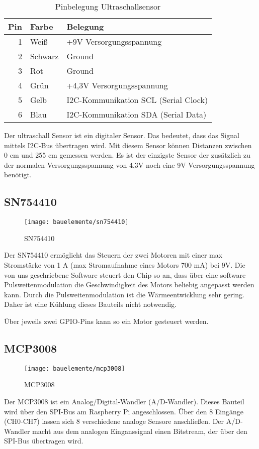 \begin{table}[!ht]
\centering
\rmfamily
\caption{Pinbelegung Ultraschallsensor}
\renewcommand{\arraystretch}{1.1}
\sffamily
\begin{footnotesize}
\begin{tabular}{r | l l}
\toprule
\textbf{Pin} & \textbf{Farbe}  & \textbf{Belegung}\\
\midrule
1 & Weiß & +9V Versorgungsspannung \\
2 & Schwarz & Ground \\
3 & Rot & Ground \\
4 & Grün & +4,3V Versorgungsspannung \\
5 & Gelb & I2C-Kommunikation SCL (Serial Clock) \\
6 & Blau & I2C-Kommunikation SDA (Serial Data) \\
\bottomrule
\end{tabular}
\end{footnotesize}
\label{eb:ultraschall:tbl}
\end{table}

Der ultraschall Sensor ist ein digitaler Sensor. Das bedeutet, dass das Signal mittels I2C-Bus übertragen wird. Mit diesem Sensor können Distanzen zwischen  0 cm und 255 cm gemessen werden. Es ist der einzigste Sensor der zusätzlich zu der normalen Versorgungsspannung von 4,3V noch eine 9V Versorgungsspannung benötigt.

\subsection{SN754410}\label{eb:pwm}
\begin{wrapfigure}{r}{0.65\textwidth}
\texttt{[image: bauelemente/sn754410]}
\caption{SN754410}
\label{eb:fig:sn754410}
\end{wrapfigure}
Der SN754410 ermöglicht das Steuern der zwei Motoren mit einer max Stromstärke von 1 A (max Stromaufnahme eines Motors 700 mA) bei 9V. Die von uns  geschriebene Software steuert den Chip so an, dass über eine software Pulsweitenmodulation die Geschwindigkeit des Motors beliebig angepasst werden kann. Durch die Pulsweitenmodulation ist die Wärmeentwicklung sehr gering. Daher ist eine Kühlung dieses Bauteils nicht notwendig.

Über jeweils zwei GPIO-Pins kann so ein Motor gesteuert werden.

\subsection{MCP3008}\label{eb:adwandler}
\begin{wrapfigure}{r}{0.4\textwidth}
\texttt{[image: bauelemente/mcp3008]}
\caption{MCP3008}
\label{eb:mcp3008}
\end{wrapfigure}
Der MCP3008 ist ein Analog/Digital-Wandler (A/D-Wandler). Dieses Bauteil wird über den SPI-Bus am Raspberry Pi angeschlossen. Über den 8 Eingänge (CH0-CH7) lassen sich 8 verschiedene analoge Sensore anschließen. Der A/D-Wandler macht aus dem analogen Einganssignal einen Bitstream, der über den SPI-Bus übertragen wird.

